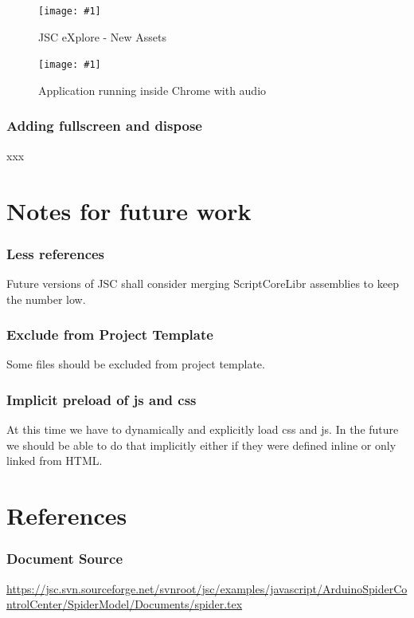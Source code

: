 \documentclass[12pt,leqno]{book}
\newcommand{\png}[1]{\texttt{[image: \#1]}}
\newcommand{\figpng}[2]{\begin{figure}[htb]\centering\png{#1}\caption{#2}\end{figure}}
\begin{document}
\figpng{Images/eXplore-2012-03-31_13.48.45}
{JSC eXplore - New Assets}

\figpng{Images/A_string_from_JavaScript._-_Google_Chrome-2012-03-31_13.54.10}
{Application running inside Chrome with audio}


\subsection{Adding fullscreen and dispose}
xxx




\chapter{Notes for future work}

\subsection{Less references}
Future versions of JSC shall consider merging ScriptCoreLibr assemblies to keep the number low.

\subsection{Exclude from Project Template}
Some files should be excluded from project template. 

\subsection{Implicit preload of js and css}
At this time we have to dynamically and explicitly load css and js. In the future we should
be able to do that implicitly either if they were defined inline or only linked from HTML.









\chapter{References}

\subsection{Document Source}

\url{https://jsc.svn.sourceforge.net/svnroot/jsc/examples/javascript/ArduinoSpiderControlCenter/SpiderModel/Documents/spider.tex}
\end{document}
